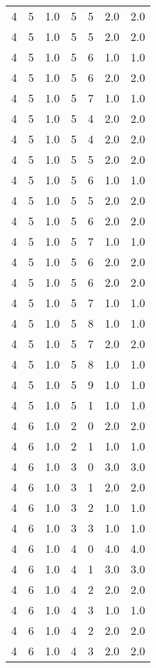 \documentclass[a4paper,12pt]{article}
\begin{document}
\begin{center}
\begin{longtable}{ c c c | c c c | c }
        4 & 5 & 1.0 & 5 & 5 & 2.0 & 2.0 \\
        4 & 5 & 1.0 & 5 & 5 & 2.0 & 2.0 \\
        4 & 5 & 1.0 & 5 & 6 & 1.0 & 1.0 \\
        4 & 5 & 1.0 & 5 & 6 & 2.0 & 2.0 \\
        4 & 5 & 1.0 & 5 & 7 & 1.0 & 1.0 \\
        4 & 5 & 1.0 & 5 & 4 & 2.0 & 2.0 \\
        4 & 5 & 1.0 & 5 & 4 & 2.0 & 2.0 \\
        4 & 5 & 1.0 & 5 & 5 & 2.0 & 2.0 \\
        4 & 5 & 1.0 & 5 & 6 & 1.0 & 1.0 \\
        4 & 5 & 1.0 & 5 & 5 & 2.0 & 2.0 \\
        4 & 5 & 1.0 & 5 & 6 & 2.0 & 2.0 \\
        4 & 5 & 1.0 & 5 & 7 & 1.0 & 1.0 \\
        4 & 5 & 1.0 & 5 & 6 & 2.0 & 2.0 \\
        4 & 5 & 1.0 & 5 & 6 & 2.0 & 2.0 \\
        4 & 5 & 1.0 & 5 & 7 & 1.0 & 1.0 \\
        4 & 5 & 1.0 & 5 & 8 & 1.0 & 1.0 \\
        4 & 5 & 1.0 & 5 & 7 & 2.0 & 2.0 \\
        4 & 5 & 1.0 & 5 & 8 & 1.0 & 1.0 \\
        4 & 5 & 1.0 & 5 & 9 & 1.0 & 1.0 \\
        4 & 5 & 1.0 & 5 & 1 & 1.0 & 1.0 \\
        4 & 6 & 1.0 & 2 & 0 & 2.0 & 2.0 \\
        4 & 6 & 1.0 & 2 & 1 & 1.0 & 1.0 \\
        4 & 6 & 1.0 & 3 & 0 & 3.0 & 3.0 \\
        4 & 6 & 1.0 & 3 & 1 & 2.0 & 2.0 \\
        4 & 6 & 1.0 & 3 & 2 & 1.0 & 1.0 \\
        4 & 6 & 1.0 & 3 & 3 & 1.0 & 1.0 \\
        4 & 6 & 1.0 & 4 & 0 & 4.0 & 4.0 \\
        4 & 6 & 1.0 & 4 & 1 & 3.0 & 3.0 \\
        4 & 6 & 1.0 & 4 & 2 & 2.0 & 2.0 \\
        4 & 6 & 1.0 & 4 & 3 & 1.0 & 1.0 \\
        4 & 6 & 1.0 & 4 & 2 & 2.0 & 2.0 \\
        4 & 6 & 1.0 & 4 & 3 & 2.0 & 2.0 \\

\end{longtable}
\end{center}
\end{document}
